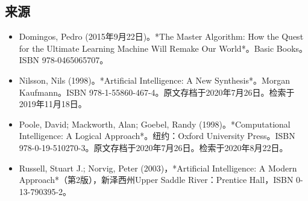 \subsection{来源}  
\begin{itemize}
\item Domingos, Pedro (2015年9月22日)。*The Master Algorithm: How the Quest for the Ultimate Learning Machine Will Remake Our World*。Basic Books。ISBN 978-0465065707。  
\item Nilsson, Nils (1998)。*Artificial Intelligence: A New Synthesis*。Morgan Kaufmann。ISBN 978-1-55860-467-4。原文存档于2020年7月26日。检索于2019年11月18日。  
\item Poole, David; Mackworth, Alan; Goebel, Randy (1998)。*Computational Intelligence: A Logical Approach*。纽约：Oxford University Press。ISBN 978-0-19-510270-3。原文存档于2020年7月26日。检索于2020年8月22日。  
\item Russell, Stuart J.; Norvig, Peter (2003)，*Artificial Intelligence: A Modern Approach*（第2版），新泽西州Upper Saddle River：Prentice Hall，ISBN 0-13-790395-2。
\end{itemize}
